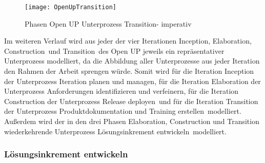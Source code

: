\begin{figure}[htp]
\begin{center}
  \texttt{[image: OpenUpTransition]} %
  \caption{Phasen Open UP Unterprozess Transition- imperativ}
  \label{fig:OpenUpTransition}
\end{center}
\end{figure}



Im weiteren Verlauf wird aus jeder der vier Iterationen \grqq Inception\grqq, \grqq Elaboration\grqq, \grqq Construction\grqq \  und \grqq Transition\grqq \  des Open UP jeweils ein repräsentativer Unterprozess modelliert, da die Abbildung aller Unterprozesse aus jeder Iteration den Rahmen der Arbeit sprengen würde. \newline
Somit wird für die Iteration Inception der Unterprozess \grqq Iteration planen und managen\grqq, für die Iteration Elaboration der Unterprozess \grqq Anforderungen identifizieren und verfeinern\grqq, für die Iteration Construction der Unterprozess \grqq Release deployen\grqq \ und für die Iteration Transition der Unterprozess \grqq Produktdokumentation und Training erstellen\grqq \ modelliert. Außerdem wird der in den drei Phasen Elaboration, Construction und Transition wiederkehrende Unterprozess \grqq Lösungsinkrement entwickeln\grqq \ modelliert.

\subsubsection{Lösungsinkrement entwickeln}

